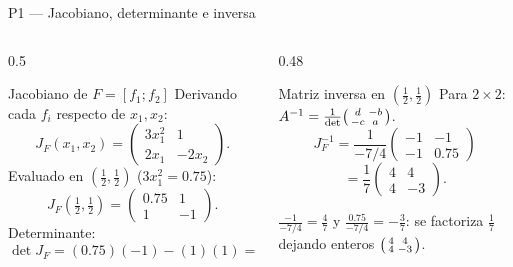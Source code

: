 \documentclass[aspectratio=169,10pt]{beamer}
\begin{document}
\begin{frame}{P1 — Jacobiano, determinante e inversa}
\begin{columns}[T]
\begin{column}{0.5\textwidth}
\begin{cardgear}{Jacobiano de $F=[f_1;f_2]$}{\faCogs}
{\footnotesize Derivando cada $f_i$ respecto de $x_1,x_2$:
\[
J_F(x_1,x_2)=\begin{pmatrix} 3x_1^{2} & 1\\[1mm] 2x_1 & -2x_2 \end{pmatrix}.
\]
Evaluado en $(\tfrac12,\tfrac12)$ ($3x_1^2=0.75$):
\[
J_F(\tfrac12,\tfrac12)=\begin{pmatrix} 0.75 & 1\\[1mm] 1 & -1 \end{pmatrix}.
\]
Determinante:
\[
\det J_F=(0.75)(-1)-(1)(1)=-\tfrac74=-1.75.
\]}
\end{cardgear}
\end{column}
\begin{column}{0.48\textwidth}
\begin{cardgear}{Matriz inversa en $(\tfrac12,\tfrac12)$}{\faSuperscript}
{\footnotesize Para $2\times2$: $A^{-1}=\tfrac1{\det}\begin{psmallmatrix} d & -b\\ -c & a\end{psmallmatrix}$.
\[
J_F^{-1}=\frac1{-7/4}\begin{pmatrix} -1 & -1\\ -1 & 0.75\end{pmatrix}
\]
\[
=\frac17\begin{pmatrix} 4 & 4\\ 4 & -3\end{pmatrix}.
\]}
\end{cardgear}
\vspace{1mm}
\begin{cardnota}[\faCheckCircle]
{\footnotesize $\tfrac{-1}{-7/4}=\tfrac47$ y $\tfrac{0.75}{-7/4}=-\tfrac37$: se factoriza $\tfrac17$ dejando enteros $\begin{psmallmatrix}4&4\\4&-3\end{psmallmatrix}$.}
\end{cardnota}
\end{column}
\end{columns}
\end{frame}
\end{document}
